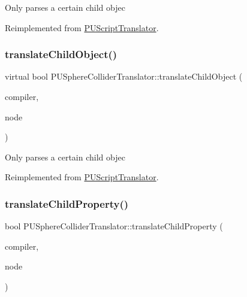 Only parses a certain child objec 

Reimplemented from \hyperlink{classPUScriptTranslator_ab587d01348ae3e678cb700c719b2b113}{P\+U\+Script\+Translator}.

\mbox{\label{classPUSphereColliderTranslator_a172b05b60718bde4249dcc2a3b384e02}} 
\subsubsection{\texorpdfstring{translate\+Child\+Object()}{translateChildObject()}\hspace{0.1cm}{\footnotesize\ttfamily [2/2]}}
{\footnotesize\ttfamily virtual bool P\+U\+Sphere\+Collider\+Translator\+::translate\+Child\+Object (\begin{DoxyParamCaption}\item[{\hyperlink{classPUScriptCompiler}{P\+U\+Script\+Compiler} $\ast$}]{compiler,  }\item[{\hyperlink{classPUAbstractNode}{P\+U\+Abstract\+Node} $\ast$}]{node }\end{DoxyParamCaption})\hspace{0.3cm}{\ttfamily [virtual]}}

Only parses a certain child objec 

Reimplemented from \hyperlink{classPUScriptTranslator_ab587d01348ae3e678cb700c719b2b113}{P\+U\+Script\+Translator}.

\mbox{\label{classPUSphereColliderTranslator_a2fefc53a967f3a27c7b6662524c835bd}} 
\subsubsection{\texorpdfstring{translate\+Child\+Property()}{translateChildProperty()}\hspace{0.1cm}{\footnotesize\ttfamily [1/2]}}
{\footnotesize\ttfamily bool P\+U\+Sphere\+Collider\+Translator\+::translate\+Child\+Property (\begin{DoxyParamCaption}\item[{\hyperlink{classPUScriptCompiler}{P\+U\+Script\+Compiler} $\ast$}]{compiler,  }\item[{\hyperlink{classPUAbstractNode}{P\+U\+Abstract\+Node} $\ast$}]{node }\end{DoxyParamCaption})\hspace{0.3cm}{\ttfamily [virtual]}}


